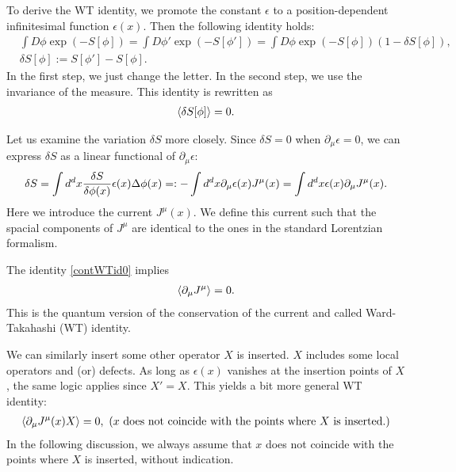 \documentclass[12pt]{scrartcl}
\newcommand{\del}{\partial}
\begin{document}
To derive the WT identity, we promote the constant $\epsilon$ to a position-dependent infinitesimal function  $\epsilon(x)$.  Then the following identity holds:
\begin{align}
    &\int D\phi \exp(-S[\phi])=
    \int D\phi' \exp(-S[\phi'])=
    \int D\phi \exp(-S[\phi]) (1-\delta S[\phi]),\\
    &\delta S[\phi]:=S[\phi']-S[\phi].
\end{align}
In the first step, we just change the letter.  In the second step, we use the invariance of the measure.
This identity is rewritten as
\begin{align}
    \expval{\delta S[\phi]}=0.
    \label{contWTid0}
\end{align}

Let us examine the variation $\delta S$ more closely.  Since $\delta S=0$ when $\del_{\mu}\epsilon=0$,  we can express $\delta S$ as a linear functional of $\del_{\mu}\epsilon$:
\begin{align}
    \delta S=\int d^dx \fdv{S}{\phi(x)}\epsilon(x)\Delta\phi(x)
    =:-\int d^d x\del_{\mu}\epsilon(x) J^{\mu}(x)=
    \int d^dx \epsilon(x)\del_{\mu}J^{\mu}(x).\label{defcurrent}
\end{align}
Here we introduce the current $J^{\mu}(x)$.  We define this current such that the spacial components of $J^{\mu}$ are identical to the ones in the standard Lorentzian formalism.

The identity \eqref{contWTid0} implies
\begin{align}
    \expval{\del_{\mu}J^{\mu}}=0.
\end{align}
This is the quantum version of the conservation of the current and called Ward-Takahashi (WT) identity.

We can similarly insert some other operator $X$ is inserted.  $X$ includes some local operators and (or) defects.  As long as $\epsilon(x)$ vanishes at the insertion points of $X$, the same logic applies since $X'=X$.  This yields a bit more general WT identity:
\begin{align}
    \expval{\del_{\mu}J^{\mu}(x) X}=0,\ (x \text{ does not coincide with the points where $X$ is inserted.})
    \label{WTid0.5}
\end{align}
In the following discussion, we always assume that $x$ does not coincide with the points where $X$ is inserted, without indication.
\end{document}
